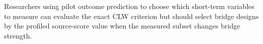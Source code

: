 Researchers using pilot outcome prediction to choose which short-term variables to measure can evaluate the exact CLW criterion but should select bridge designs by the profiled source-score value when the measured subset changes bridge strength.